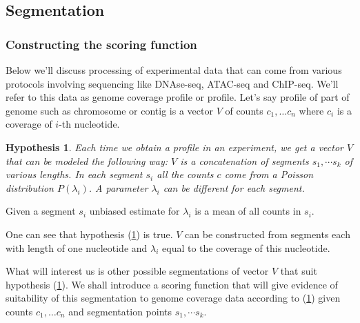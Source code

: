 \documentclass[10pt,letterpaper]{article}
\newtheorem{hyp}{Hypothesis}
\begin{document}



\subsection{Segmentation}
\subsubsection{Constructing the scoring function}
Below we'll discuss processing of experimental data that can come from various protocols involving sequencing like DNAse-seq, ATAC-seq and ChIP-seq. We'll refer to this data as genome coverage profile or profile.
Let's say profile of part of genome such as chromosome or contig is a vector $V$ of counts $c_1, \dots c_n$
where $c_i$ is a coverage of $i$-th nucleotide.
\begin{hyp}
    \label{hyp:main}
Each time we obtain a profile in an experiment, we get a vector $V$ that can be modeled the following way:
$V$ is a concatenation of segments $s_1, \cdots s_k$ of various lengths. In each segment $s_i$ all the counts $c$ come from a Poisson distribution
    $P(\lambda_i)$. A parameter $\lambda_i$ can be different for each segment.
\end{hyp}
Given a segment $s_i$ unbiased estimate for $\lambda_i$ is a mean of all counts in $s_i$.

One can see that hypothesis (\ref{hyp:main}) is true. 
$V$ can be constructed from segments each with length of one nucleotide
and $\lambda_i$ equal to the coverage of this nucleotide. 

What will interest us is other possible segmentations of vector $V$ that suit hypothesis (\ref{hyp:main}).
We shall introduce a scoring function that will give evidence of
suitability of this segmentation to genome coverage data according to (\ref{hyp:main}) given counts
$c_1, \dots c_n$ and segmentation points $s_1, \cdots s_k$.
\end{document}
